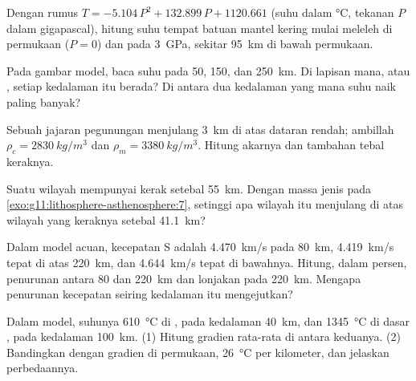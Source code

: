 \begin{exercise}[$\star$]\label{exo:g11:lithosphere-asthenosphere:5}
Dengan rumus $T = -5.104\,P^2 + 132.899\,P + 1120.661$ (suhu dalam
\unit{\celsius}, tekanan $P$ dalam gigapascal), hitung suhu tempat batuan
mantel kering mulai meleleh di permukaan ($P = 0$) dan pada
\qty{3}{GPa}, sekitar \qty{95}{km} di bawah permukaan.
\end{exercise}

\begin{exercise}[$\star\star$]\label{exo:g11:lithosphere-asthenosphere:6}
Pada gambar  model, baca suhu pada 50, 150, dan
\qty{250}{km}. Di lapisan mana,  atau , setiap kedalaman itu
berada? Di antara dua kedalaman yang mana suhu naik paling banyak?
\end{exercise}

\begin{exercise}[$\star\star$]\label{exo:g11:lithosphere-asthenosphere:7}
Sebuah jajaran pegunungan menjulang \qty{3}{km} di atas dataran rendah; ambillah
$\rho_c =
\qty{2830}{kg/m^3}$ dan $\rho_m = \qty{3380}{kg/m^3}$. Hitung akarnya dan
tambahan tebal keraknya.
\end{exercise}

\begin{exercise}[$\star\star$]\label{exo:g11:lithosphere-asthenosphere:8}
Suatu wilayah mempunyai kerak setebal \qty{55}{km}. Dengan massa jenis pada
\cref{exo:g11:lithosphere-asthenosphere:7}, setinggi apa wilayah itu menjulang
di atas wilayah yang keraknya setebal \qty{41.1}{km}?
\end{exercise}

\begin{exercise}[$\star\star$]\label{exo:g11:lithosphere-asthenosphere:9}
Dalam model acuan, kecepatan S adalah \qty{4.470}{km/s} pada \qty{80}{km},
\qty{4.419}{km/s} tepat di atas \qty{220}{km}, dan \qty{4.644}{km/s} tepat di
bawahnya. Hitung, dalam persen, penurunan antara 80 dan \qty{220}{km} dan
lonjakan pada \qty{220}{km}. Mengapa penurunan kecepatan seiring kedalaman itu
mengejutkan?
\end{exercise}

\begin{exercise}[$\star\star$]\label{exo:g11:lithosphere-asthenosphere:10}
Dalam  model, suhunya \qty{610}{\celsius} di , pada kedalaman
\qty{40}{km}, dan \qty{1345}{\celsius} di dasar , pada kedalaman
\qty{100}{km}. (1) Hitung gradien rata-rata di antara keduanya. (2)
Bandingkan dengan gradien di permukaan, \qty{26}{\celsius} per kilometer,
dan jelaskan perbedaannya.
\end{exercise}

